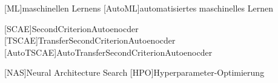 \begin{acronym}[IEEE]
	[ML]{maschinellen Lernens}
	[AutoML]{automatisiertes maschinelles Lernen}
	
	[SCAE]{SecondCriterionAutoenocder}
	[TSCAE]{TransferSecondCriterionAutoenocder}
	[AutoTSCAE]{AutoTransferSecondCriterionAutoenocder}
	
	[NAS]{Neural Architecture Search}
	[HPO]{Hyperparameter-Optimierung}			
	
\end{acronym}
